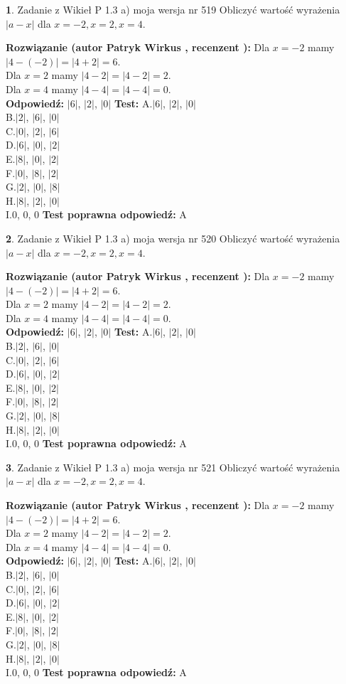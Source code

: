 \documentclass[12pt, a4paper]{article}
\theoremstyle{definition} %
\newtheorem{zad}{}
\newcommand{\zadStart}[1]{\begin{zad}#1\newline}
\newcommand{\zadStop}{\end{zad}}
\newcommand{\rozwStart}[2]{\noindent \textbf{Rozwiązanie (autor #1 , recenzent #2): }\newline}
\newcommand{\rozwStop}{\newline}
\newcommand{\odpStart}{\noindent \textbf{Odpowiedź:}\newline}
\newcommand{\odpStop}{\newline}
\newcommand{\testStart}{\noindent \textbf{Test:}\newline}
\newcommand{\testStop}{\newline}
\newcommand{\kluczStart}{\noindent \textbf{Test poprawna odpowiedź:}\newline}
\newcommand{\kluczStop}{\newline}
\begin{document}
\zadStart{Zadanie z Wikieł P 1.3 a) moja wersja nr 519}
Obliczyć wartość wyrażenia $|a - x|$ dla $x=-2,x=2,x=4$.
\zadStop
\rozwStart{Patryk Wirkus}{}
Dla $x = -2$ mamy $|4 - (-2)| = |4 + 2| = 6$.\\
Dla $x = 2$ mamy $|4 - 2| = |4 - 2| = 2$.\\
Dla $x = 4$ mamy $|4 - 4| = |4 - 4| = 0$.\\
\rozwStop
\odpStart
$|6|$, $|2|$, $|0|$
\odpStop
\testStart
A.$|6|$, $|2|$, $|0|$\\
B.$|2|$, $|6|$, $|0|$\\
C.$|0|$, $|2|$, $|6|$\\
D.$|6|$, $|0|$, $|2|$\\
E.$|8|$, $|0|$, $|2|$\\
F.$|0|$, $|8|$, $|2|$\\
G.$|2|$, $|0|$, $|8|$\\
H.$|8|$, $|2|$, $|0|$\\
I.$0$, $0$, $0$
\testStop
\kluczStart
A
\kluczStop



\zadStart{Zadanie z Wikieł P 1.3 a) moja wersja nr 520}
Obliczyć wartość wyrażenia $|a - x|$ dla $x=-2,x=2,x=4$.
\zadStop
\rozwStart{Patryk Wirkus}{}
Dla $x = -2$ mamy $|4 - (-2)| = |4 + 2| = 6$.\\
Dla $x = 2$ mamy $|4 - 2| = |4 - 2| = 2$.\\
Dla $x = 4$ mamy $|4 - 4| = |4 - 4| = 0$.\\
\rozwStop
\odpStart
$|6|$, $|2|$, $|0|$
\odpStop
\testStart
A.$|6|$, $|2|$, $|0|$\\
B.$|2|$, $|6|$, $|0|$\\
C.$|0|$, $|2|$, $|6|$\\
D.$|6|$, $|0|$, $|2|$\\
E.$|8|$, $|0|$, $|2|$\\
F.$|0|$, $|8|$, $|2|$\\
G.$|2|$, $|0|$, $|8|$\\
H.$|8|$, $|2|$, $|0|$\\
I.$0$, $0$, $0$
\testStop
\kluczStart
A
\kluczStop



\zadStart{Zadanie z Wikieł P 1.3 a) moja wersja nr 521}
Obliczyć wartość wyrażenia $|a - x|$ dla $x=-2,x=2,x=4$.
\zadStop
\rozwStart{Patryk Wirkus}{}
Dla $x = -2$ mamy $|4 - (-2)| = |4 + 2| = 6$.\\
Dla $x = 2$ mamy $|4 - 2| = |4 - 2| = 2$.\\
Dla $x = 4$ mamy $|4 - 4| = |4 - 4| = 0$.\\
\rozwStop
\odpStart
$|6|$, $|2|$, $|0|$
\odpStop
\testStart
A.$|6|$, $|2|$, $|0|$\\
B.$|2|$, $|6|$, $|0|$\\
C.$|0|$, $|2|$, $|6|$\\
D.$|6|$, $|0|$, $|2|$\\
E.$|8|$, $|0|$, $|2|$\\
F.$|0|$, $|8|$, $|2|$\\
G.$|2|$, $|0|$, $|8|$\\
H.$|8|$, $|2|$, $|0|$\\
I.$0$, $0$, $0$
\testStop
\kluczStart
A
\kluczStop
\end{document}
